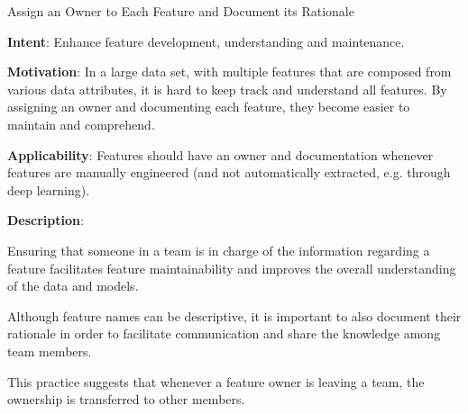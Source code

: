   
  \begin{frame}[plain]{ Assign an Owner to Each Feature and Document its Rationale
 }

  \textbf{Intent}: Enhance feature development, understanding and maintenance. 
 

  \textbf{Motivation}: In a large data set, with multiple features that are composed from various data attributes, it is hard to keep track and understand all features. By assigning an owner and documenting each feature, they become easier to maintain and comprehend. 
 

  \textbf{Applicability}: Features should have an owner and documentation whenever features are manually engineered (and not automatically extracted, e.g. through deep learning).
 

  \textbf{Description}: 

Ensuring that someone in a team is in charge of the information regarding a feature facilitates feature maintainability and improves the overall understanding of the data and models.


Although feature names can be descriptive, it is important to also document their rationale in order to facilitate communication and share the knowledge among team members.


This practice suggests that whenever a feature owner is leaving a team, the ownership is transferred to other members.


 


  \end{frame}


